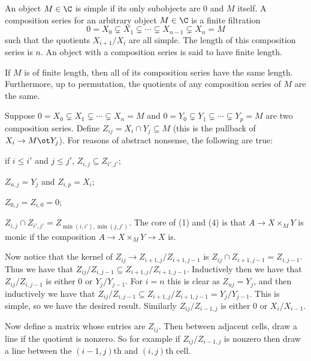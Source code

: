 \bdefn

    An object $M\in\C$ is {\emphcolor simple} if its only subobjects are $0$ and $M$ itself.
    A {\emphcolor composition series} for an arbitrary object $M\in\C$ is a finite filtration
    $$ 0 = X_0 \subsetneq X_1 \subsetneq \cdots \subsetneq X_{n-1} \subsetneq X_n = M $$
    such that the quotients $X_{i+1}/X_i$ are all simple.
    The {\emphcolor length} of this composition series is $n$.
    An object with a composition series is said to have {\emphcolor finite length}.

\edefn

\bthrm[title={Jordan-H\"older}, name={jordhold}]

    If $M$ is of finite length, then all of its composition series have the same length.
    Furthermore, up to permutation, the quotients of any composition series of $M$ are the same.

\ethrm

\bproof

    Suppose $0=X_0\subsetneq X_1\subsetneq\cdots\subsetneq X_n=M$ and $0=Y_0\subsetneq Y_1\subsetneq\cdots\subsetneq Y_p=M$ are two composition series.
    Define $Z_{ij}=X_i\cap Y_j\subseteq M$ (this is the pullback of $X_i\to M\ot Y_j$).
    For reasons of abstract nonsense, the following are true:
    \benum
        \item if $i\leq i'$ and $j\leq j'$, $Z_{i,j}\subseteq Z_{i',j'}$;
        \item $Z_{n,j}=Y_j$ and $Z_{i,p}=X_i$;
        \item $Z_{0,j}=Z_{i,0}=0$;
        \item $Z_{i,j}\cap Z_{i',j'}=Z_{\min(i,i'),\min(j,j')}$.
    \eenum
    The core of (1) and (4) is that $A\to X\times_MY$ is monic if the composition $A\to X\times_MY\to X$ is.

    Now notice that the kernel of $Z_{ij}\to Z_{i+1,j}/Z_{i+1,j-1}$ is $Z_{ij}\cap Z_{i+1,j-1}=Z_{i,j-1}$.
    Thus we have that $Z_{ij}/Z_{i,j-1}\subseteq Z_{i+1,j}/Z_{i+1,j-1}$.
    Inductively then we have that $Z_{ij}/Z_{i,j-1}$ is either $0$ or $Y_j/Y_{j-1}$.
    For $i=n$ this is clear as $Z_{nj}=Y_j$, and then inductively we have that $Z_{ij}/Z_{i,j-1}\subseteq Z_{i+1,j}/Z_{i+1,j-1}=Y_j/Y_{j-1}$.
    This is simple, so we have the desired result.
    Similarly $Z_{ij}/Z_{i-1,j}$ is either $0$ or $X_i/X_{i-1}$.

    Now define a matrix whose entries are $Z_{ij}$.
    Then between adjacent cells, draw a line if the quotient is nonzero.
    So for example if $Z_{ij}/Z_{i-1,j}$ is nonzero then draw a line between the $(i-1,j)$th and $(i,j)$th cell.

